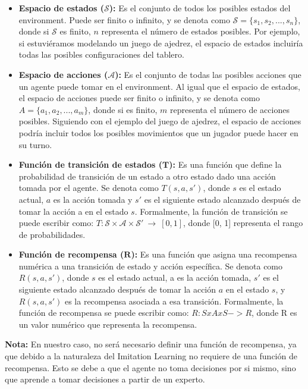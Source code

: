 \begin{itemize}
    \item \textbf{Espacio de estados ($\boldsymbol{\mathcal{S}}$):} Es el conjunto de todos los posibles estados del environment. 
    Puede ser finito o infinito, y se denota como $\mathcal{S} = \{s_1, s_2, ..., s_n\}$, donde si $\mathcal{S}$ es finito, $n$ representa 
    el número de estados posibles. Por ejemplo, si estuviéramos modelando un juego de ajedrez, el espacio 
    de estados incluiría todas las posibles configuraciones del tablero.

    \item \textbf{Espacio de acciones ($\boldsymbol{\mathcal{A}}$):} Es el conjunto de todas las posibles acciones que un agente 
    puede tomar en el environment. Al igual que el espacio de estados, el espacio de acciones puede ser finito 
    o infinito, y se denota como $A = \{a_1, a_2, ..., a_m\}$, donde si es finito, $m$ representa el número de 
    acciones posibles. Siguiendo con el ejemplo del juego de ajedrez, el espacio de acciones podría incluir 
    todos los posibles movimientos que un jugador puede hacer en su turno.

    \item \textbf{Función de transición de estados ($\boldsymbol{T}$):} Es una función que define la probabilidad de transición 
    de un estado a otro estado dado una acción tomada por el agente. Se denota como $T(s, a, s')$, donde $s$ es el 
    estado actual, $a$ es la acción tomada y $s'$ es el siguiente estado alcanzado después de tomar la acción a en 
    el estado $s$. Formalmente, la función de transición se puede escribir como: 
    $T: \mathcal{S} \times \mathcal{A} \times \mathcal{S'} \ \rightarrow \ [0,1]$, donde 
    [0, 1] representa el rango de probabilidades.

    \item \textbf{Función de recompensa ($\boldsymbol{R}$):} Es una función que asigna una recompensa numérica a una transición 
    de estado y acción específica. Se denota como $R(s, a, s')$, donde $s$ es el estado actual, a es la acción tomada, 
    $s'$ es el siguiente estado alcanzado después de tomar la acción $a$ en el estado $s$, y $R(s, a, s')$ es 
    la recompensa asociada a esa transición. Formalmente, la función de recompensa se puede escribir 
    como: $R: S x A x S -> R$, donde R es un valor numérico que representa la recompensa. 
\end{itemize}

\textbf{Nota: } En nuestro caso, no será necesario definir una función de recompensa, ya que debido a la 
naturaleza del Imitation Learning no requiere de una función de recompensa. Esto se debe a que el agente 
no toma decisiones por si mismo, sino que aprende a tomar decisiones a partir de un experto.

